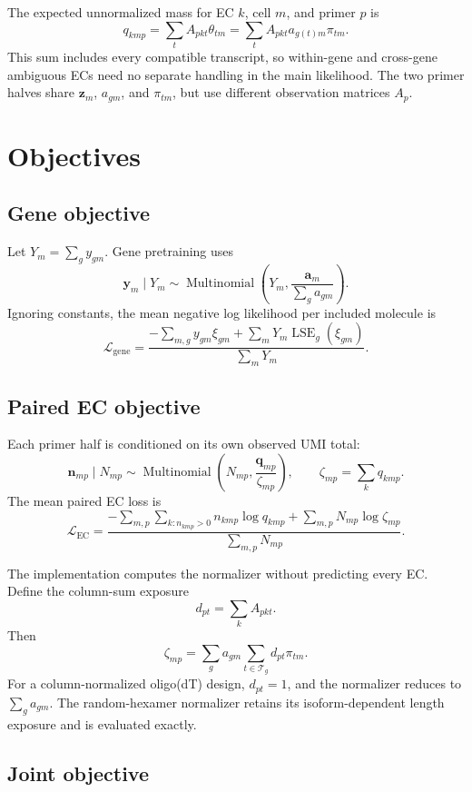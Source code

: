 \documentclass[11pt]{article}
\begin{document}
The expected unnormalized mass for EC \(k\), cell \(m\), and primer \(p\) is
\[
  q_{kmp}
  =
  \sum_t A_{pkt}\theta_{tm}
  =
  \sum_t A_{pkt}a_{g(t)m}\pi_{tm}.
\]
This sum includes every compatible transcript, so within-gene and cross-gene
ambiguous ECs need no separate handling in the main likelihood. The two
primer halves share \(\bm z_m\), \(a_{gm}\), and \(\pi_{tm}\), but use
different observation matrices \(A_p\).

\section*{Objectives}

\subsection*{Gene objective}

Let \(Y_m=\sum_g y_{gm}\). Gene pretraining uses
\[
  \bm y_m\mid Y_m
  \sim
  \operatorname{Multinomial}
  \left(
    Y_m,
    \frac{\bm a_m}{\sum_g a_{gm}}
  \right).
\]
Ignoring constants, the mean negative log likelihood per included molecule is
\[
  \mathcal L_{\mathrm{gene}}
  =
  \frac{
    -\sum_{m,g}y_{gm}\xi_{gm}
    +\sum_mY_m\operatorname{LSE}_g(\xi_{gm})
  }{
    \sum_mY_m
  }.
\]

\subsection*{Paired EC objective}

Each primer half is conditioned on its own observed UMI total:
\[
  \bm n_{mp}\mid N_{mp}
  \sim
  \operatorname{Multinomial}
  \left(
    N_{mp},
    \frac{\bm q_{mp}}{\zeta_{mp}}
  \right),
  \qquad
  \zeta_{mp}=\sum_kq_{kmp}.
\]
The mean paired EC loss is
\[
  \mathcal L_{\mathrm{EC}}
  =
  \frac{
    -\sum_{m,p}\sum_{k:n_{kmp}>0}n_{kmp}\log q_{kmp}
    +\sum_{m,p}N_{mp}\log\zeta_{mp}
  }{
    \sum_{m,p}N_{mp}
  }.
\]

The implementation computes the normalizer without predicting every EC.
Define the column-sum exposure
\[
  d_{pt}=\sum_kA_{pkt}.
\]
Then
\[
  \zeta_{mp}
  =
  \sum_g a_{gm}
  \sum_{t\in\mathcal T_g}d_{pt}\pi_{tm}.
\]
For a column-normalized oligo(dT) design, \(d_{pt}=1\), and the normalizer
reduces to \(\sum_ga_{gm}\). The random-hexamer normalizer retains its
isoform-dependent length exposure and is evaluated exactly.

\subsection*{Joint objective}
\end{document}
